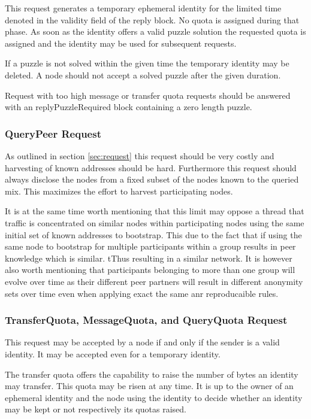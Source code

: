 This request generates a temporary ephemeral identity for the limited time denoted in the validity field of the reply block. No quota is assigned during that phase. As soon as the identity offers a valid puzzle solution the requested quota is assigned and the identity may be used for subsequent requests.

If a puzzle is not solved within the given time the temporary identity may be deleted. A node should not accept a solved puzzle after the given duration. 

Request with too high message or transfer quota requests should be answered with an replyPuzzleRequired block containing a zero length puzzle.

\subsubsection{QueryPeer Request}
As outlined in section \ref{sec:request} this request should be very costly and harvesting of known addresses should be hard. Furthermore this request should always  disclose the nodes from a fixed subset of the nodes known to the queried mix. This maximizes the effort to harvest participating nodes.

It is at the same time worth mentioning that this limit may oppose a thread that traffic is concentrated on similar nodes within participating nodes using the same initial set of known addresses to bootstrap. This due to the fact that if using the same node to bootstrap for multiple participants within a group results in peer knowledge which is similar. tThus resulting in a similar network. It is however also worth mentioning that participants belonging to more than one group will evolve over time as their different peer partners will result in different anonymity sets over time even when applying exact the same anr reproducaible rules.


\subsubsection{TransferQuota, MessageQuota,  and QueryQuota Request}
This request may be accepted by a node if and only if the sender is a valid identity. It may be accepted even for a temporary identity.

The transfer quota offers the capability to raise the number of bytes an identity may transfer. This quota may be risen at any time. It is up to the owner of an ephemeral identity and the node using the identity to decide whether an identity may be kept or not respectively its quotas raised.

